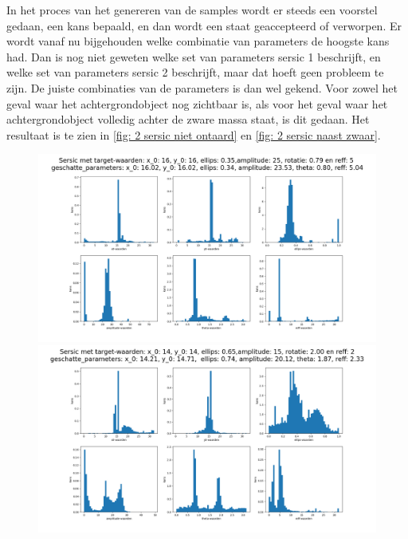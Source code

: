 In het proces van het genereren van de samples wordt er steeds een voorstel gedaan, een kans bepaald, en dan wordt een staat geaccepteerd of verworpen. Er wordt vanaf nu bijgehouden welke combinatie van parameters de hoogste kans had. Dan is nog niet geweten welke set van parameters sersic 1 beschrijft, en welke set van parameters sersic 2 beschrijft, maar dat hoeft geen probleem te zijn. De juiste combinaties van de parameters is dan wel gekend. Voor zowel het geval waar het achtergrondobject nog zichtbaar is, als voor het geval waar het achtergrondobject volledig achter de zware massa staat, is dit gedaan. Het resultaat is te zien in \cref{fig: 2 sersic niet ontaard} en \cref{fig: 2 sersic naast zwaar}.
\begin{figure}
    \begin{minipage}{0.98\linewidth}
        \includegraphics[width=0.95\linewidth]{Figures/1_emcee_hist_6000_750.png}   
        \includegraphics[width=0.95\linewidth]{Figures/2_emcee_hist_6000_750.png}

\end{minipage}
\end{figure}
